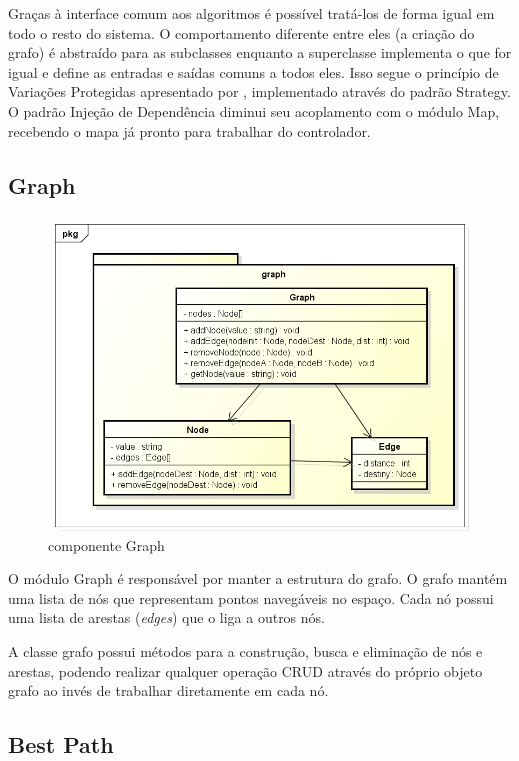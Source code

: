 Graças à interface comum aos algoritmos é possível tratá-los de forma igual em todo o resto do sistema. O comportamento diferente entre eles (a criação do grafo) é abstraído para as subclasses enquanto a superclasse implementa o que for igual e define as entradas e saídas comuns a todos eles. Isso segue o princípio de Variações Protegidas apresentado por \cite{Larman2005}, implementado através do padrão Strategy. O padrão Injeção de Dependência diminui seu acoplamento com o módulo Map, recebendo o mapa já pronto para trabalhar do controlador.

\subsection{Graph}

\begin{figure}[h]
	\centering
	\label{fig26}
		\includegraphics[keepaspectratio=true,scale=0.5]{figuras/pkggraph.png}
	\caption{componente Graph}
\end{figure}

O módulo Graph é responsável por manter a estrutura do grafo. O grafo mantém uma lista de nós que representam pontos navegáveis no espaço. Cada nó possui uma lista de arestas (\textit{edges}) que o liga a outros nós.

A classe grafo possui métodos para a construção, busca e eliminação de nós e arestas, podendo realizar qualquer operação CRUD através do próprio objeto grafo ao invés de trabalhar diretamente em cada nó.

\subsection{Best Path}

